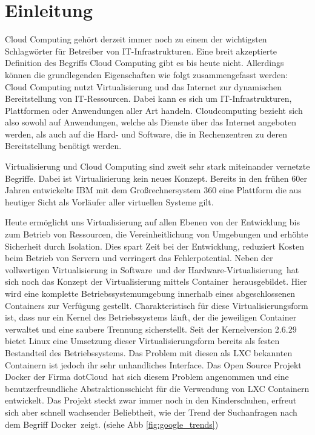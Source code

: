\chapter{Einleitung}
\label{sec:einleitung}

Cloud Computing gehört derzeit immer noch zu einem der wichtigsten Schlagwörter für Betreiber von IT-Infrastrukturen.
\glqq Eine breit akzeptierte Definition des Begriffs Cloud Computing gibt es bis heute nicht. Allerdings können die grundlegenden Eigenschaften wie folgt zusammengefasst werden: Cloud Computing nutzt Virtualisierung und das Internet zur dynamischen Bereitstellung von IT-Ressourcen. Dabei kann es sich um IT-Infrastrukturen, Plattformen oder Anwendungen aller Art handeln.\grqq \cite[S. 28]{meinel_virtualisierung_2011} Cloudcomputing bezieht sich also sowohl auf Anwendungen, welche als Dienste über das Internet angeboten werden, als auch auf die Hard- und Software, die in Rechenzentren zu deren Bereitstellung benötigt werden.

Virtualisierung und Cloud Computing sind zweit sehr stark miteinander vernetzte Begriffe.
Dabei ist Virtualisierung kein neues Konzept. Bereits in den frühen 60er Jahren entwickelte IBM mit dem Großrechnersystem 360 eine Plattform die aus heutiger Sicht als Vorläufer aller virtuellen Systeme gilt. \cite{frank_balmes_grin_????}

Heute ermöglicht uns Virtualisierung auf \glqq allen Ebenen von der Entwicklung bis zum Betrieb von Ressourcen, die Vereinheitlichung von Umgebungen und erhöhte Sicherheit durch Isolation. Dies spart Zeit bei der Entwicklung, reduziert Kosten beim Betrieb von Servern und verringert das Fehlerpotential.\grqq \cite[S. 1]{schroder_container-virtualisierung_2014}
Neben der vollwertigen \grq Virtualisierung in Software\grq\ und der \grq Hardware-Virtualisierung\grq\ hat sich noch das Konzept der \grq Virtualisierung mittels Container\grq\ herausgebildet.
\glqq Hier wird eine komplette Betriebssystemumgebung innerhalb eines abgeschlossenen Containers zur Verfügung gestellt. Charakteristisch für diese Virtualisierungsform ist, dass nur ein Kernel des Betriebssystems läuft, der die jeweiligen Container verwaltet und eine saubere Trennung sicherstellt.\grqq \cite{plotner_linux_2012}
Seit der Kernelversion 2.6.29 \cite{fischer_linux_2014} bietet Linux eine Umsetzung dieser Virtualisierungsform bereits als festen Bestandteil des Betriebssystems.
Das Problem mit diesen als LXC bekannten Containern ist jedoch ihr sehr unhandliches Interface.
Das Open Source Projekt Docker der Firma \grq dotCloud\grq\ hat sich diesem Problem angenommen und eine benutzerfreundliche Abstraktionsschicht für die Verwendung von LXC Containern entwickelt. Das Projekt steckt zwar immer noch in den Kinderschuhen, erfreut sich aber schnell wachsender Beliebtheit, wie der Trend der Suchanfragen nach dem Begriff \grq Docker\grq\ zeigt. (siehe Abb \ref{fig:google_trends}) 

